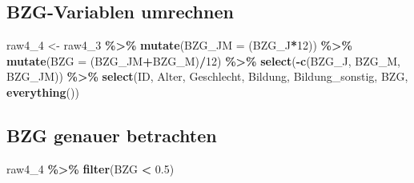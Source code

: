 \documentclass[
]{article}
\newenvironment{Shaded}{\begin{snugshade}}{\end{snugshade}}
\newcommand{\AttributeTok}[1]{\textcolor[rgb]{0.13,0.29,0.53}{#1}}
\newcommand{\DecValTok}[1]{\textcolor[rgb]{0.00,0.00,0.81}{#1}}
\newcommand{\FloatTok}[1]{\textcolor[rgb]{0.00,0.00,0.81}{#1}}
\newcommand{\FunctionTok}[1]{\textcolor[rgb]{0.13,0.29,0.53}{\textbf{#1}}}
\newcommand{\NormalTok}[1]{#1}
\newcommand{\OtherTok}[1]{\textcolor[rgb]{0.56,0.35,0.01}{#1}}
\newcommand{\SpecialCharTok}[1]{\textcolor[rgb]{0.81,0.36,0.00}{\textbf{#1}}}
\begin{document}
\subsection{BZG-Variablen umrechnen}\label{bzg-variablen-umrechnen}

\begin{Shaded}
\begin{Highlighting}[]
\NormalTok{raw4\_4 }\OtherTok{\textless{}{-}}\NormalTok{ raw4\_3 }\SpecialCharTok{\%\textgreater{}\%} 
  \FunctionTok{mutate}\NormalTok{(}\AttributeTok{BZG\_JM =}\NormalTok{ (BZG\_J}\SpecialCharTok{*}\DecValTok{12}\NormalTok{)) }\SpecialCharTok{\%\textgreater{}\%} 
  \FunctionTok{mutate}\NormalTok{(}\AttributeTok{BZG =}\NormalTok{ (BZG\_JM}\SpecialCharTok{+}\NormalTok{BZG\_M)}\SpecialCharTok{/}\DecValTok{12}\NormalTok{) }\SpecialCharTok{\%\textgreater{}\%} 
  \FunctionTok{select}\NormalTok{(}\SpecialCharTok{{-}}\FunctionTok{c}\NormalTok{(BZG\_J, BZG\_M, BZG\_JM)) }\SpecialCharTok{\%\textgreater{}\%} 
  \FunctionTok{select}\NormalTok{(ID, Alter, Geschlecht, Bildung, Bildung\_sonstig, BZG, }\FunctionTok{everything}\NormalTok{())}
\end{Highlighting}
\end{Shaded}

\subsection{BZG genauer betrachten}\label{bzg-genauer-betrachten}

\begin{Shaded}
\begin{Highlighting}[]
\NormalTok{raw4\_4 }\SpecialCharTok{\%\textgreater{}\%} 
  \FunctionTok{filter}\NormalTok{(BZG }\SpecialCharTok{\textless{}} \FloatTok{0.5}\NormalTok{) }
\end{Highlighting}
\end{Shaded}
\end{document}
